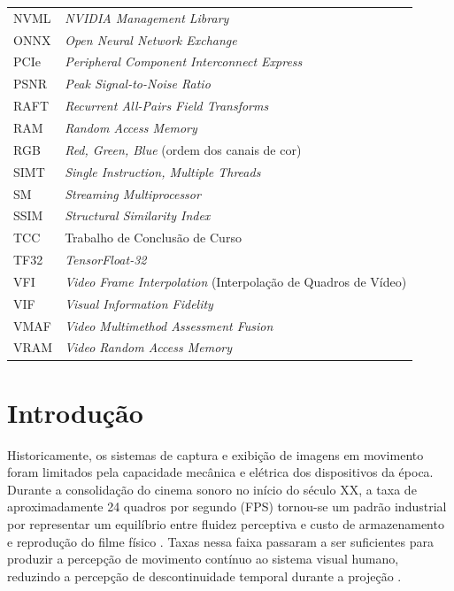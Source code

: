 \documentclass[
    12pt,                %
    openright,           %
    oneside,             %
    a4paper,             %
    english,             %
    brazil               %
]{abntex2}
\begin{document}
\begin{table}[htb]
\begin{tabularx}{\textwidth}{@{}p{5.0cm}Y@{}}
NVML  & \textit{NVIDIA Management Library} \\
ONNX  & \textit{Open Neural Network Exchange} \\
PCIe  & \textit{Peripheral Component Interconnect Express} \\
PSNR  & \textit{Peak Signal-to-Noise Ratio} \\
RAFT  & \textit{Recurrent All-Pairs Field Transforms} \\
RAM   & \textit{Random Access Memory} \\
RGB   & \textit{Red, Green, Blue} (ordem dos canais de cor) \\
SIMT  & \textit{Single Instruction, Multiple Threads} \\
SM    & \textit{Streaming Multiprocessor} \\
SSIM  & \textit{Structural Similarity Index} \\
TCC   & Trabalho de Conclusão de Curso \\
TF32  & \textit{TensorFloat-32} \\
VFI  & \textit{Video Frame Interpolation} (Interpolação de Quadros de Vídeo) \\
VIF   & \textit{Visual Information Fidelity} \\
VMAF  & \textit{Video Multimethod Assessment Fusion} \\
VRAM  & \textit{Video Random Access Memory} \\
\bottomrule
\end{tabularx}
\end{table}

\cleardoublepage

\tableofcontents*
\cleardoublepage

\textual


\chapter{Introdução}
\label{cap:introducao}

Historicamente, os sistemas de captura e exibição de imagens em movimento foram limitados pela capacidade mecânica e elétrica dos dispositivos da época. Durante a consolidação do cinema sonoro no início do século XX, a taxa de aproximadamente 24 quadros por segundo (FPS) tornou-se um padrão industrial por representar um equilíbrio entre fluidez perceptiva e custo de armazenamento e reprodução do filme físico \cite{Bordwell2016}. Taxas nessa faixa passaram a ser suficientes para produzir a percepção de movimento contínuo ao sistema visual humano, reduzindo a percepção de descontinuidade temporal durante a projeção \cite{Watkinson2009}.
\end{document}
